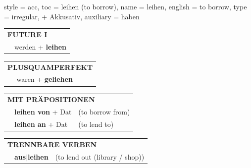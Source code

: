 \begin{verbentry}{
  style = {acc},
  toc = {leihen (to borrow)},
  name = {leihen},
  english = {to borrow},
  type = {irregular, + Akkusativ},
  auxiliary = {haben}
}
\begin{tabular}{rl}
    \multicolumn{2}{l}{\textbf{FUTURE I} }\\
   & werden + \textbf{leihen}\\
 
  \end{tabular}
\hfill
   \begin{tabular}{rl}
      \multicolumn{2}{l}{\textbf{PLUSQUAMPERFEKT}}\\
   & waren + \textbf{geliehen}\\
  \end{tabular}
  


 \vspace{10pt}

   \begin{tabular}{lll}
      \multicolumn{3}{l}{\textbf{MIT PRÄPOSITIONEN}}\\
& \textbf{leihen von} + Dat & (to borrow from)\\
& \textbf{leihen an} + Dat & (to lend to)\\
  \end{tabular}
  \hfill
   \begin{tabular}{lll}
      \multicolumn{3}{l}{\textbf{TRENNBARE VERBEN}}\\
 & \textbf{aus$|$leihen} & (to lend out (library / shop))\\
  \end{tabular}


  \vspace{-5pt}
\end{verbentry}

